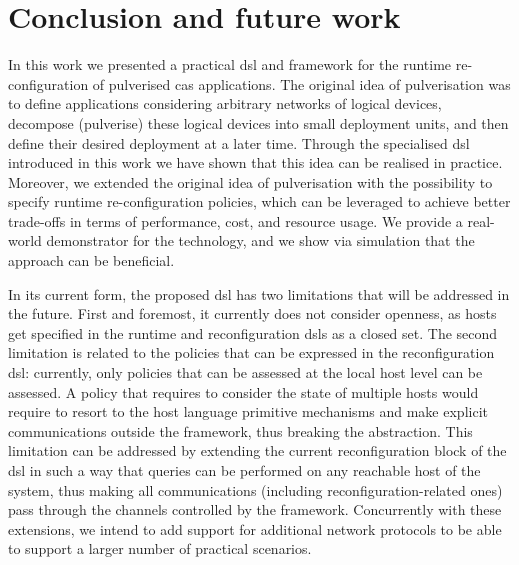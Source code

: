 \documentclass[conference]{IEEEtran}
\begin{document}

\section{Conclusion and future work}\label{sec:conclusion}

In this work we presented a practical \ac{dsl} and framework for the
runtime re-configuration of pulverised \ac{cas} applications.
%
The original idea of pulverisation was to define applications considering arbitrary networks of logical devices,
decompose (pulverise) these logical devices into small deployment units,
and then define their desired deployment at a later time.
%
Through the specialised \ac{dsl} introduced in this work
we have shown that this idea can be realised in practice.
%
Moreover, we extended the original idea of pulverisation with the possibility to specify runtime re-configuration policies,
which can be leveraged to achieve better trade-offs in terms of performance, cost, and resource usage.
%
We provide a real-world demonstrator for the technology,
and we show via simulation that the approach can be beneficial.

In its current form, the proposed \ac{dsl} has two limitations that will be addressed in the future.
%
First and foremost, it currently does not consider openness,
as hosts get specified in the runtime and reconfiguration \acp{dsl} as a closed set.
%
The second limitation is related to the policies that can be expressed in the reconfiguration \ac{dsl}:
currently, only policies that can be assessed at the local host level can be assessed.
%
A policy that requires to consider the state of multiple hosts would require to resort to the host language primitive mechanisms and make explicit communications outside the framework,
thus breaking the abstraction.
%
This limitation can be addressed by extending the current reconfiguration
block of the \ac{dsl} in such a way that queries can be performed on any reachable host of the system,
thus making all communications
(including reconfiguration-related ones)
pass through the channels controlled by the framework.
%
Concurrently with these extensions,
we intend to add support for additional network protocols to be able to support a larger number of practical scenarios.
\end{document}
